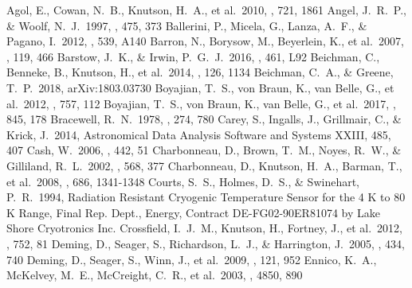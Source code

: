 \documentclass{aastex62}
\begin{document}
\vspace{5mm}


\begin{thebibliography}{}

 Agol, E., Cowan, N.~B., Knutson, H.~A., et al.\ 2010, \apj, 721, 1861
 Angel, J.~R.~P., \& Woolf, N.~J.\ 1997, \apj, 475, 373
 Ballerini, P., Micela, G., Lanza, A.~F., \& Pagano, I.\ 2012, \aap, 539, A140
 Barron, N., Borysow, M., Beyerlein, K., et al.\ 2007, \pasp, 119, 466
 Barstow, J.~K., \& Irwin, P.~G.~J.\ 2016, \mnras, 461, L92
 Beichman, C., Benneke, B., Knutson, H., et al.\ 2014, \pasp, 126, 1134
 Beichman, C.~A., \& Greene, T.~P.\ 2018, arXiv:1803.03730
 Boyajian, T.~S., von Braun, K., van Belle, G., et al.\ 2012, \apj, 757, 112
 Boyajian, T.~S., von Braun, K., van Belle, G., et al.\ 2017, \apj, 845, 178
 Bracewell, R.~N.\ 1978, \nat, 274, 780
 Carey, S., Ingalls, J., Grillmair, C., \& Krick, J.\ 2014, Astronomical Data Analysis Software and Systems XXIII, 485, 407
 Cash, W.\ 2006, \nat, 442, 51
 Charbonneau, D., Brown, T.~M., Noyes, R.~W., \& Gilliland, R.~L.\ 2002, \apj, 568, 377
 Charbonneau, D., Knutson, H.~A., Barman, T., et al.\ 2008, \apj, 686, 1341-1348
 Courts, S.~S., Holmes, D.~S., \& Swinehart, P.~R.\ 1994, Radiation Resistant Cryogenic Temperature Sensor for the 4 K to 80 K Range, Final Rep. Dept., Energy, Contract DE-FG02-90ER81074 by Lake Shore Cryotronics Inc.
 Crossfield, I.~J.~M., Knutson, H., Fortney, J., et al.\ 2012, \apj, 752, 81
 Deming, D., Seager, S., Richardson, L.~J., \& Harrington, J.\ 2005, \nat, 434, 740
 Deming, D., Seager, S., Winn, J., et al.\ 2009, \pasp, 121, 952
 Ennico, K.~A., McKelvey, M.~E., McCreight, C.~R., et al.\ 2003, \procspie, 4850, 890

\end{thebibliography}
\end{document}
